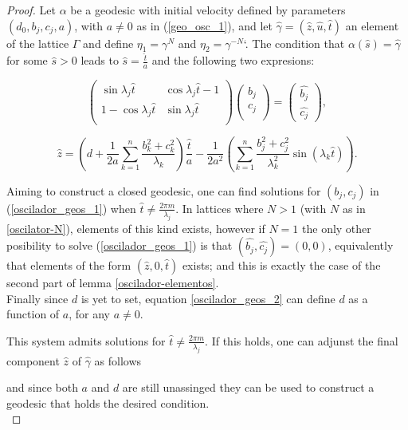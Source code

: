 \documentclass[11pt]{amsart}
\theoremstyle{plain}
\theoremstyle{definition}
\theoremstyle{remark}
\begin{document}
\begin{proof}
    Let $\alpha$ be a geodesic with initial velocity defined by parameters $(d_0,b_j,c_j,a)$, with $a \neq 0$ as in (\ref{geo_osc_1}), and let $\hat{\gamma}=(\hat{z},\hat{u},\hat{t})$ an element of the lattice $\Gamma$ and define $\eta_1 = \gamma^{N}$ and $\eta_2 = \gamma^{-N}$`. The condition that $\alpha(\hat{s}) = \hat{\gamma}$ for some $\hat{s} > 0$ leads to $\hat{s} = \frac{\hat{t}}{a}$ and the following two expresions: 
    
\begin{equation}\label{oscilador_geos_1}
\left( \begin{matrix}
\sin{\lambda_j \hat{t}} & \cos{\lambda_j \hat{t}} -1 \\
1 - \cos{\lambda_j \hat{t}} & \sin{\lambda_j \hat{t}} \\
\end{matrix} \right)
\left( \begin{matrix}
b_j \\
c_j \\
\end{matrix} \right)=
\left( \begin{matrix}
\hat{b_j} \\
\hat{c_j}
\end{matrix} \right),
\end{equation}

\begin{equation}\label{oscilador_geos_2}
    \hat{z} =  \left(d + \frac{1}{2 a} \sum_{k=1}^{n} \frac{ b_{k}^{2}+c_k^{2}}{\lambda_k}\right)\frac{\hat{t}}{a}- \frac{1}{2 a^{2}} \left(  \sum_{k=1}^{n} \frac{b_{j}^{2}+c_j^2}{\lambda_k^{2}} \sin(\lambda_k \hat{t}) \right).
\end{equation}

Aiming to construct a closed geodesic, one can find solutions for $(b_j,c_j)$ in (\ref{oscilador_geos_1}) when $\hat{t} \neq \frac{2 \pi m}{\lambda_j}$. In lattices where $N > 1$ (with $N$ as in \ref{oscilator-N}), elements of this kind exists, however if $N = 1$ the only other posibility to solve (\ref{oscilador_geos_1}) is that $(\hat{b_j}, \hat{c_j}) = (0,0)$, equivalently that elements of the form $(\hat{z}, 0, \hat{t})$ exists; and this is exactly the case of the second part of lemma \ref{oscilador-elementos}.\\ 

Finally since $d$ is yet to set, equation \eqref{oscilador_geos_2} can define $d$ as a function of $a$, for any $a \neq 0$. 

This system admits solutions for $\hat{t} \neq \frac{2 \pi m}{\lambda_j}$. If this holds, one can adjunst the final component $\hat{z}$ of $\hat{\gamma}$ as follows



and since both $a$ and $d$ are still unassinged they can be used to construct a geodesic that holds the desired condition.\\ 
\end{proof}
\end{document}

